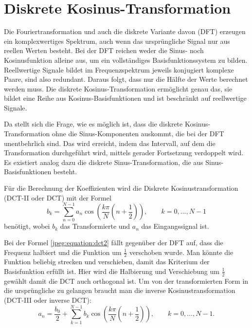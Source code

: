 %
%
%
%
\section{Diskrete Kosinus-Transformation
\label{jpeg:section:dct}}
Die Fouriertransformation und auch die diskrete Variante davon (DFT) erzeugen ein komplexwertiges Spektrum, auch wenn das ursprüngliche Signal nur aus reellen Werten besteht.
Bei der DFT reichen weder die Sinus- noch Kosinusfunktion alleine aus, um ein vollständiges Basisfunktions\-system zu bilden.
Reellwertige Signale bildet im Frequenzspektrum jeweils konjugiert komplexe Paare, sind also redundant.
Daraus folgt, dass nur die Hälfte der Werte berechnet werden muss.
Die diskrete Kosinus-Transformation ermöglicht genau das, sie bildet eine Reihe aus Kosinus-Basisfunktionen und ist beschränkt auf reellwertige Signale.

Da stellt sich die Frage, wie es möglich ist, dass die diskrete Kosinus-Transformation ohne die Sinus-Komponenten auskommt, die bei der DFT unentbehrlich sind.
Das wird erreicht, indem das Intervall, auf dem die Transformation durchgeführt wird, mittels gerader Fortsetzung verdoppelt wird.
Es existiert analog dazu die diskrete Sinus-Transformation, die aus Sinus-Basisfunktionen besteht.

Für die Berechnung der Koeffizienten wird die Diskrete Kosinustransformation (DCT-II oder DCT) mit der Formel
\begin{equation}
    b_k
    =
    \sum \limits_{n=0}^{N-1} a_n 
    \cos\left(
        \frac{k\pi}{N}\left(n + \frac{1}{2} \right) 
    \right),
    \qquad k = 0,\dots,N-1
\label{jpeg:equation:dct2}
\end{equation}
benötigt, wobei \(b_k\) das Transformierte und \(a_n\) das Eingangssignal ist.

Bei der Formel \eqref{jpeg:equation:dct2} fällt gegenüber der DFT auf, dass die Frequenz halbiert und die Funktion um \(\frac{1}{2}\) verschoben wurde.
Man könnte die Funktion beliebig strecken und verschieben, damit das Kriterium der Basisfunktion erfüllt ist.
Hier wird die Halbierung und Verschiebung um \(\frac{1}{2}\) gewählt damit die DCT auch orthogonal ist.
Um von der transformierten Form in die ursprüngliche zu gelangen braucht man die inverse Kosinustransformation (DCT-III oder inverse DCT):
\begin{equation}
    a_n
    =
    \frac{b_0}{2} +
    \sum \limits_{k=1}^{N-1} b_k 
    \cos\left(
    \frac{k\pi}{N}\left(n + \frac{1}{2} \right) 
    \right),
    \qquad k = 0,\dots,N-1.
    \label{jpeg:equation:dct3}
\end{equation}

